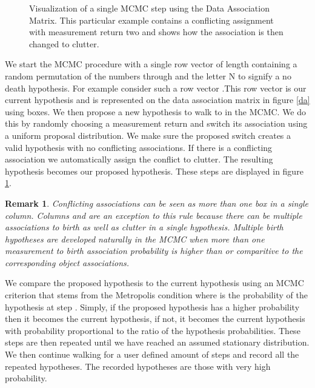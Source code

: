 \documentclass[10pt, conference]{IEEEtran}
\newtheorem{remark}{Remark}
\begin{document}
\begin{figure}[h]
\centering
{}
\caption{Visualization of a single MCMC step using the Data Association Matrix. This particular example contains a conflicting assignment with measurement return two and shows how the association is then changed to clutter.}
\label{da2}
\end{figure}
We start the MCMC procedure with a single row vector of length  containing a random permutation of the numbers  through  and the letter N to signify a no death hypothesis. For example consider such a row vector .This row vector is our current hypothesis and is represented on the data association matrix in figure \ref{da} using boxes. We then propose a new hypothesis to walk to in the MCMC. We do this by randomly choosing a measurement return and switch its association using a uniform proposal distribution. We make sure the proposed switch creates a valid hypothesis with no conflicting associations. If there is a conflicting association we automatically assign the conflict to clutter. The resulting hypothesis becomes our proposed hypothesis. These steps are displayed in figure \ref{da2}.
\begin{remark}
Conflicting associations can be seen as more than one box in a single column. Columns  and  are an exception to this rule because there can be multiple associations to birth as well as clutter in a single hypothesis. Multiple birth hypotheses are developed naturally in the MCMC when more than one measurement to birth association probability is higher than or comparitive to the corresponding object associations. 
\end{remark}
We compare the proposed hypothesis to the current hypothesis using an MCMC criterion that stems from the Metropolis condition  where  is the probability of the hypothesis at step . Simply, if the proposed hypothesis has a higher probability then it becomes the current hypothesis, if not, it becomes the current hypothesis with probability proportional to the ratio of the hypothesis probabilities. These steps are then repeated until we have reached an assumed stationary distribution. We then continue walking for a user defined amount of steps and record all the repeated hypotheses. The recorded hypotheses are those with very high probability.
\end{document}
